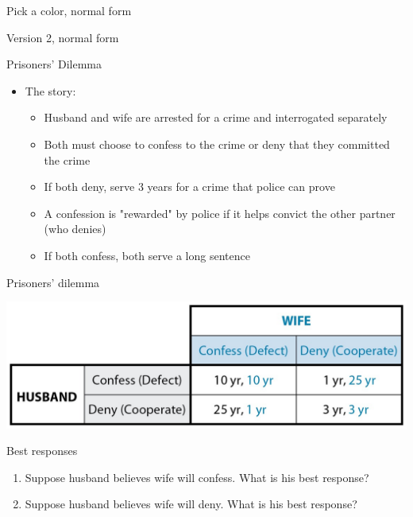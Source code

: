 \documentclass[10pt]{beamer}
\begin{document}
\begin{frame}[label={sec:org523579e}]{Pick a color, normal form}
\end{frame}

\begin{frame}[label={sec:orgd86dc42}]{Version 2, normal form}
\end{frame}

\begin{frame}[label={sec:orgbd1f451}]{}
\alert{Prisoners' Dilemma}
\begin{itemize}
\item The story:
\begin{itemize}
\item Husband and wife are arrested for a crime and interrogated separately
\item Both must choose to confess to the crime or deny that they committed the crime
\item If both deny, serve 3 years for a crime that police can prove
\item A confession is "rewarded" by police if it helps convict the other partner (who denies)
\item If both confess, both serve a long sentence
\end{itemize}
\end{itemize}
\end{frame}

\begin{frame}[label={sec:orgc929148}]{Prisoners' dilemma}
\begin{center}
\includegraphics[width=.75\textwidth]{./img/GAMES4_FIG04.04.jpg}
\end{center}
\end{frame}

\begin{frame}[label={sec:org63400c8}]{}
\alert{Best responses}
\begin{enumerate}
\item Suppose husband believes wife will confess. What is his best response?
\item Suppose husband believes wife will deny. What is his best response?
\end{enumerate}
\end{frame}
\end{document}
